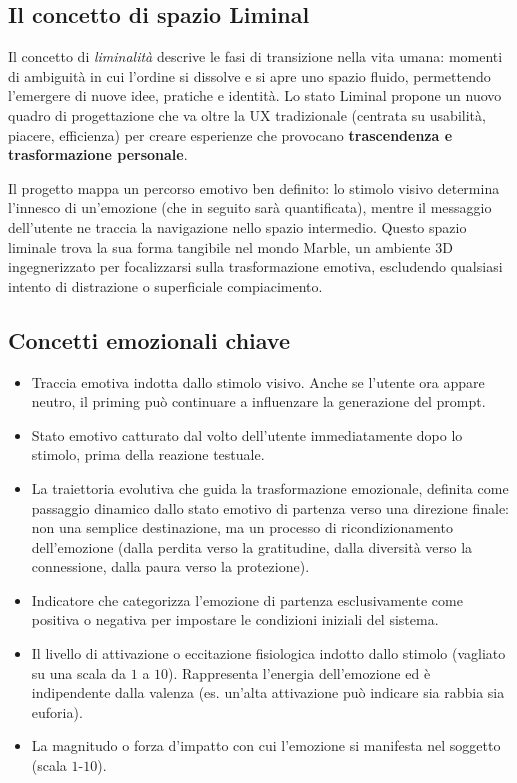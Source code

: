 \documentclass[11pt]{report}
\begin{document}
\subsection{Il concetto di spazio Liminal}
 
Il concetto di \textit{liminalità} descrive le fasi di transizione nella vita umana: momenti di ambiguità in cui l'ordine si dissolve e si apre uno spazio fluido, permettendo l'emergere di nuove idee, pratiche e identità. Lo stato Liminal propone un nuovo quadro di progettazione che va oltre la UX tradizionale (centrata su usabilità, piacere, efficienza) per creare esperienze che provocano \textbf{trascendenza e trasformazione personale}.
 
Il progetto mappa un percorso emotivo ben definito: lo stimolo visivo determina l'innesco di un'emozione (che in seguito sarà quantificata), mentre il messaggio dell'utente ne traccia la navigazione nello spazio intermedio. Questo spazio liminale trova la sua forma tangibile nel mondo Marble, un ambiente 3D ingegnerizzato per focalizzarsi sulla trasformazione emotiva, escludendo qualsiasi intento di distrazione o superficiale compiacimento.
 
\subsection{Concetti emozionali chiave}
 
\begin{itemize}
    \item[\textbf{Priming:}] Traccia emotiva indotta dallo stimolo visivo. Anche se l'utente ora appare neutro, il priming può continuare a influenzare la generazione del prompt.
    \item[\textbf{Realtime:}] Stato emotivo catturato dal volto dell'utente immediatamente dopo lo stimolo, prima della reazione testuale.
    \item[\textbf{Punto cardinale:}] La traiettoria evolutiva che guida la trasformazione emozionale, definita come passaggio dinamico dallo stato emotivo di partenza verso una direzione finale: non una semplice destinazione, ma un processo di ricondizionamento dell'emozione (dalla perdita verso la gratitudine, dalla diversità verso la connessione, dalla paura verso la protezione).
    \item[\textbf{Valenza:}]  Indicatore che categorizza l'emozione di partenza esclusivamente come positiva o negativa per impostare le condizioni iniziali del sistema.
    \item[\textbf{Arousal:}] Il livello di attivazione o eccitazione fisiologica indotto dallo stimolo (vagliato su una scala da $1$ a $10$). Rappresenta l'energia dell'emozione ed è indipendente dalla valenza (es. un'alta attivazione può indicare sia rabbia sia euforia).
    \item[\textbf{Intensità:}] La magnitudo o forza d'impatto con cui l'emozione si manifesta nel soggetto (scala $1$-$10$).
\end{itemize}
 
\end{document}
